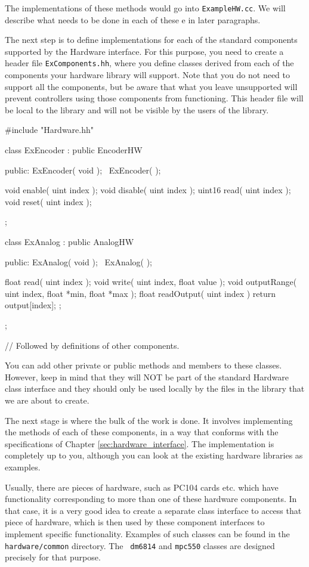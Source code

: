 The implementations of these methods would go into {\tt ExampleHW.cc}. We
will describe what needs to be done in each of these e in later paragraphs.

The next step is to define implementations for each of the standard
components supported by the Hardware interface. For this purpose, you need
to create a header file {\tt ExComponents.hh}, where you define classes
derived from each of the components your hardware library will support. Note
that you do not need to support all the components, but be aware that what
you leave unsupported will prevent controllers using those components from
functioning. This header file will be local to the library and will not be
visible by the users of the library.

\begin{classdef}
#include "Hardware.hh"

class ExEncoder : public EncoderHW {
public:
  ExEncoder( void );
  ~ExEncoder( );

  void   enable( uint index );
  void   disable( uint index );
  uint16 read( uint index );
  void   reset( uint index );
};

class ExAnalog : public AnalogHW {
public:
  ExAnalog( void );
  ~ExAnalog( );

  float read( uint index );
  void  write( uint index, float value );
  void  outputRange( uint index, float *min, float *max );
  float readOutput( uint index ) { return output[index]; };
};

// Followed by definitions of other components.
\end{classdef}

You can add other private or public methods and members to these
classes. However, keep in mind that they will NOT be part of the standard
Hardware class interface and they should only be used locally by the files
in the library that we are about to create.

The next stage is where the bulk of the work is done. It involves
implementing the methods of each of these components, in a way that conforms
with the specifications of Chapter \ref{sec:hardware_interface}. The
implementation is completely up to you, although you can look at the
existing hardware libraries as examples.

Usually, there are pieces of hardware, such as PC104 cards etc. which have
functionality corresponding to more than one of these hardware
components. In that case, it is a very good idea to create a separate class
interface to access that piece of hardware, which is then used by these
component interfaces to implement specific functionality. Examples of such
classes can be found in the {\tt hardware/common} directory. The {\tt
dm6814} and {\tt mpc550} classes are designed precisely for that purpose.

